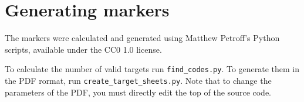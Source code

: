 \chapter{Generating markers}

The markers were calculated and generated using Matthew Petroff's Python scripts, available under the CC0 1.0 license.

To calculate the number of valid targets run \verb|find_codes.py|.
To generate them in the PDF rormat, run \verb|create_target_sheets.py|.
Note that to change the parameters of the PDF, you must directly edit the top of the source code.


%
%
%
